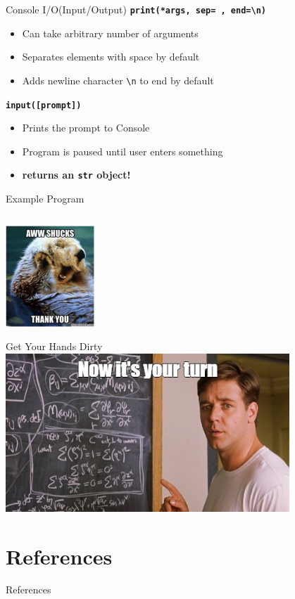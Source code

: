 		\begin{frame}{Console I/O(Input/Output)}
			\huge
			\textbf{\texttt{print(*args, sep=\textquotesingle \ \textquotesingle, end=\textquotesingle \textbackslash n\textquotesingle )}}
			\pause
			\begin{itemize}
				\LARGE
				\item Can take arbitrary number of arguments
				\pause
				\item Separates elements with space by default
				\pause
				\item Adds newline character \texttt{\textquotesingle \textbackslash n\textquotesingle} to end by default
			\end{itemize}
			
			\pause
			\textbf{\texttt{input([prompt])}}
			\pause
			\begin{itemize}
				\LARGE
				\item Prints the prompt to Console
				\pause
				\item Program is paused until user enters something
				\pause
				\item \textbf{returns an \texttt{str} object!} 
			\end{itemize}
		\end{frame}

		\begin{frame}{Example Program}
			\inputminted[frame=single,framesep=2pt,fontsize=\LARGE]{python3}{code-examples/example_io.py}
			\pause
			\centering
			\includegraphics[width=0.25\textwidth]{images/thanks.png}

		\end{frame}
		
		\begin{frame}{Get Your Hands Dirty}
		    \vspace{5mm}
		    \centering
            \includegraphics[width=0.8\textwidth]{images/your_turn.jpg}

		\end{frame}

	\section{References}
		\begin{frame}{References}
			
			
		\end{frame}

